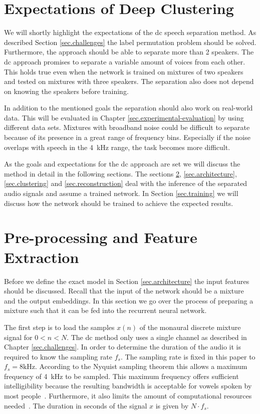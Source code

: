 \section{Expectations of Deep Clustering}\label{sec.expectations}

We will shortly highlight the expectations of the \acrlong{dc} speech separation method. As described Section \ref{sec.challenges} the label permutation problem should be solved. Furthermore, the approach should be able to separate more than 2 speakers. The \gls{dc} approach promises to separate a variable amount of voices from each other. This holds true even when the network is trained on mixtures of two speakers and tested on mixtures with three speakers. The separation also does not depend on knowing the speakers before training. \cite{Hershey2016}

In addition to the mentioned goals the separation should also work on real-world data. This will be evaluated in Chapter \ref{sec.experimental-evaluation} by using different data sets. Mixtures with broadband noise could be difficult to separate because of its presence in a great range of frequency bins. Especially if the noise overlaps with speech in the \SI{4}{\kHz} range, the task becomes more difficult.

As the goals and expectations for the \gls{dc} approach are set we will discuss the method in detail in the following sections. 
The sections \ref{sec.preprocessing}, \ref{sec.architecture}, \ref{sec.clustering} and \ref{sec.reconstruction} deal with the inference of the separated audio signals and assume a trained network. In Section \ref{sec.training} we will discuss how the network should be trained to achieve the expected results.

\section{Pre-processing and Feature Extraction}\label{sec.preprocessing}
Before we define the exact model in Section \ref{sec.architecture} the input features should be discussed. Recall that the input of the network should be a mixture and the output embeddings. In this section we go over the process of preparing a mixture such that it can be fed into the recurrent neural network.


The first step is to load the samples $x(n)$ of the monaural discrete mixture signal for $0 < n < N$. The \gls{dc} method only uses a single channel as described in Chapter \ref{sec.challenges}.
In order to determine the duration of the audio it is required to know the sampling rate $f_s$. The sampling rate is fixed in this paper to $f_s=8\si{\kHz}$. According to the Nyquist sampling theorem this allows a maximum frequency of \SI{4}{\kHz} to be sampled. This maximum frequency offers sufficient intelligibility because the resulting bandwidth is acceptable for vowels spoken by most people~\cite{Heide1998}.
Furthermore, it also limits the amount of computational resources needed~\cite[p.~33]{Hershey2016}.
The duration in seconds of the signal $x$ is given by $N \cdot f_s$.

